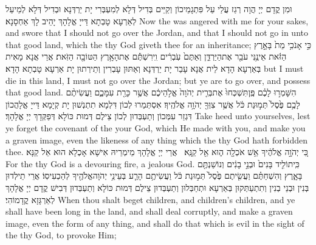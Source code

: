 {וּמִן קֳדָם יְיָ הֲוָה רְגַז עֲלַי עַל פִּתְגָמֵיכוֹן וְקַיֵּים בְּדִיל דְּלָא לְמִעְבְּרִי יָת יַרְדְּנָא וּבְדִיל דְּלָא לְמֵיעַל לְאַרְעָא טָבְתָא דַּייָ אֱלָהָךְ יָהֵיב לָךְ אַחְסָנָא׃}
{Now the \lord\space was angered with me for your sakes, and swore that I should not go over the Jordan, and that I should not go in unto that good land, which the \lord\space thy God giveth thee for an inheritance;}{}
{כִּ֣י אָנֹכִ֥י מֵת֙ בָּאָ֣רֶץ הַזֹּ֔את אֵינֶ֥נִּי עֹבֵ֖ר אֶת\maqqaf הַיַּרְדֵּ֑ן וְאַתֶּם֙ עֹֽבְרִ֔ים וִֽירִשְׁתֶּ֕ם אֶת\maqqaf הָאָ֥רֶץ הַטּוֹבָ֖ה הַזֹּֽאת׃}
{אֲרֵי אֲנָא מָאִית בְּאַרְעָא הָדָא לֵית אֲנָא עָבַר יָת יַרְדְּנָא וְאַתּוּן עָבְרִין וְתֵירְתוּן יָת אַרְעָא טָבְתָא הָדָא׃}
{but I must die in this land, I must not go over the Jordan; but ye are to go over, and possess that good land.}{}
{הִשָּׁמְר֣וּ לָכֶ֗ם פֶּֽן\maqqaf תִּשְׁכְּחוּ֙ אֶת\maqqaf בְּרִ֤ית יְהֹוָה֙ אֱלֹ֣הֵיכֶ֔ם אֲשֶׁ֥ר כָּרַ֖ת עִמָּכֶ֑ם וַעֲשִׂיתֶ֨ם לָכֶ֥ם פֶּ֙סֶל֙ תְּמ֣וּנַת כֹּ֔ל אֲשֶׁ֥ר צִוְּךָ֖ יְהֹוָ֥ה אֱלֹהֶֽיךָ׃}
{אִסְתְּמַרוּ לְכוֹן דִּלְמָא תִתְנְשׁוּן יָת קְיָמָא דַּייָ אֱלָהֲכוֹן דִּגְזַר עִמְּכוֹן וְתַעְבְּדוּן לְכוֹן צֵילֶם דְּמוּת כּוֹלָא דְּפַקְּדָךְ יְיָ אֱלָהָךְ׃}
{Take heed unto yourselves, lest ye forget the covenant of the \lord\space your God, which He made with you, and make you a graven image, even the likeness of any thing which the \lord\space thy God hath forbidden thee.}{}
{כִּ֚י יְהֹוָ֣ה אֱלֹהֶ֔יךָ אֵ֥שׁ אֹכְלָ֖ה ה֑וּא אֵ֖ל קַנָּֽא׃ \petucha }
{אֲרֵי יְיָ אֱלָהָךְ מֵימְרֵיהּ אִישָׁא אָכְלָא הוּא אֵל קַנָּא׃}
{For the \lord\space thy God is a devouring fire, a jealous God.}{}
{כִּֽי\maqqaf תוֹלִ֤יד בָּנִים֙ וּבְנֵ֣י בָנִ֔ים וְנוֹשַׁנְתֶּ֖ם בָּאָ֑רֶץ וְהִשְׁחַתֶּ֗ם וַעֲשִׂ֤יתֶם פֶּ֙סֶל֙ תְּמ֣וּנַת כֹּ֔ל וַעֲשִׂיתֶ֥ם הָרַ֛ע בְּעֵינֵ֥י יְהֹוָה\maqqaf אֱלֹהֶ֖יךָ לְהַכְעִיסֽוֹ׃}
{אֲרֵי תֵילְדוּן בְּנִין וּבְנֵי בְנִין וְתִתְעַתְּקוּן בְּאַרְעָא וּתְחַבְּלוּן וְתַעְבְּדוּן צֵילֶם דְּמוּת כּוֹלָא וְתַעְבְּדוּן דְּבִישׁ קֳדָם יְיָ אֱלָהָךְ לְאַרְגָּזָא קֳדָמוֹהִי׃}
{When thou shalt beget children, and children’s children, and ye shall have been long in the land, and shall deal corruptly, and make a graven image, even the form of any thing, and shall do that which is evil in the sight of the \lord\space thy God, to provoke Him;}{}
